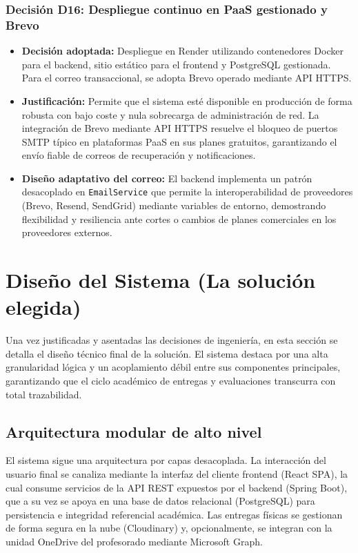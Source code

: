 \subsubsection*{Decisi\'on D16: Despliegue continuo en PaaS gestionado y Brevo}
\begin{itemize}
    \item \textbf{Decisi\'on adoptada:} Despliegue en Render \cite{render} utilizando contenedores Docker \cite{docker} para el backend, sitio est\'atico para el frontend y PostgreSQL gestionada. Para el correo transaccional, se adopta Brevo \cite{brevo} operado mediante API HTTPS.
    \item \textbf{Justificaci\'on:} Permite que el sistema est\'e disponible en producci\'on de forma robusta con bajo coste y nula sobrecarga de administraci\'on de red. La integraci\'on de Brevo mediante API HTTPS resuelve el bloqueo de puertos SMTP t\'ipico en plataformas PaaS en sus planes gratuitos, garantizando el env\'io fiable de correos de recuperaci\'on y notificaciones.
    \item \textbf{Dise\~no adaptativo del correo:} El backend implementa un patr\'on desacoplado en \texttt{EmailService} que permite la interoperabilidad de proveedores (Brevo, Resend, SendGrid) mediante variables de entorno, demostrando flexibilidad y resiliencia ante cortes o cambios de planes comerciales en los proveedores externos.
\end{itemize}

\FloatBarrier
\section{Dise\~no del Sistema (La soluci\'on elegida)}

Una vez justificadas y asentadas las decisiones de ingenier\'ia, en esta secci\'on se detalla el dise\~no t\'ecnico final de la soluci\'on. El sistema destaca por una alta granularidad l\'ogica y un acoplamiento d\'ebil entre sus componentes principales, garantizando que el ciclo acad\'emico de entregas y evaluaciones transcurra con total trazabilidad.

\subsection{Arquitectura modular de alto nivel}

El sistema sigue una arquitectura por capas desacoplada. La interacci\'on del usuario final se canaliza mediante la interfaz del cliente frontend (React SPA), la cual consume servicios de la API REST expuestos por el backend (Spring Boot), que a su vez se apoya en una base de datos relacional (PostgreSQL) para persistencia e integridad referencial acad\'emica. Las entregas f\'isicas se gestionan de forma segura en la nube (Cloudinary) y, opcionalmente, se integran con la unidad OneDrive del profesorado mediante Microsoft Graph.

